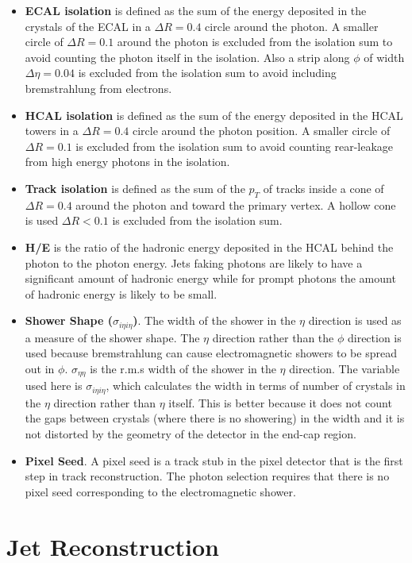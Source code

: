 \begin{itemize}
\item {\bf ECAL isolation} is defined as the sum of the energy deposited in the
crystals of the ECAL in a $\Delta R = 0.4$ circle around the photon. A smaller 
circle of $\Delta R = 0.1$ around the photon is excluded from the isolation sum 
to avoid counting the photon itself in the isolation. Also a strip along $\phi$ 
of width $\Delta \eta = 0.04$ is excluded from the isolation sum to avoid 
including bremstrahlung from electrons.
\item {\bf HCAL isolation} is defined as the sum of the energy deposited in the 
HCAL towers in a $\Delta R = 0.4$ circle around the photon position. A smaller 
circle of $\Delta R = 0.1$ is excluded from the isolation sum to avoid counting 
rear-leakage from high energy photons in the isolation.
\item {\bf Track isolation} is defined as the sum of the $p_{T}$ of tracks 
inside a cone of $\Delta R = 0.4$ around the photon and toward the primary 
vertex. A hollow cone is used $\Delta R < 0.1$ is excluded from the isolation 
sum.
\item {\bf H/E} is the ratio of the hadronic energy deposited in the HCAL behind
the photon to the photon energy. Jets faking photons are likely to have a 
significant amount of hadronic energy while for prompt photons the amount of 
hadronic energy is likely to be small.
\item {\bf Shower Shape ($\sigma_{i\eta i\eta}$)}. The width of the shower in 
the $\eta$ direction is used as a measure of the shower shape. The $\eta$ 
direction rather than the $\phi$ direction is used because bremstrahlung can 
cause electromagnetic showers to be spread out in $\phi$. $\sigma_{\eta\eta}$ is
the r.m.s width of the shower in the $\eta$ direction. The variable used here is
$\sigma_{i\eta i\eta}$, which calculates the width in terms of number of 
crystals in the $\eta$ direction rather than $\eta$ itself. This is better 
because it does not count the gaps between crystals (where there is no 
showering) in the width and it is not distorted by the geometry of the detector 
in the end-cap region.
\item {\bf Pixel Seed}. A pixel seed is a track stub in the pixel detector that 
is the first step in track reconstruction. The photon selection requires that 
there is no pixel seed corresponding to the electromagnetic shower.
\end{itemize}

\section{Jet Reconstruction}

